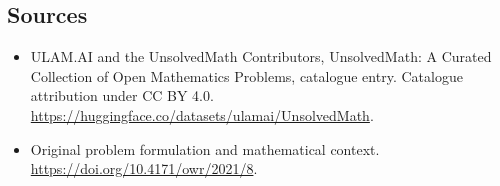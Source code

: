 \documentclass[11pt]{article}
\begin{document}
\subsection{Sources}
\begin{itemize}
\item[\hypertarget{source:statement:1}{S1}] ULAM.AI and the UnsolvedMath Contributors, UnsolvedMath: A Curated Collection of Open Mathematics Problems, catalogue entry. Catalogue attribution under CC BY 4.0.
\url{https://huggingface.co/datasets/ulamai/UnsolvedMath}.
\item[\hypertarget{source:statement:2}{S2}] Original problem formulation and mathematical context.
\url{https://doi.org/10.4171/owr/2021/8}.
\end{itemize}
\label{end:statement}
\end{document}
